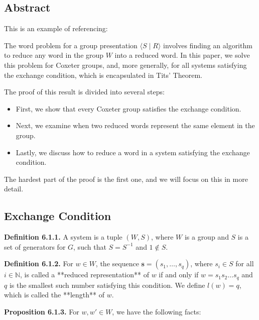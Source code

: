 \documentclass[../main.tex]{subfiles}
\begin{document}
\setcounter{subsection}{-1}
\subsection{Abstract}


This is an example of referencing: \cite{Bourbaki}\cite{Davis}

The word problem for a group presentation \( \langle S \mid R \rangle \) involves finding an algorithm to reduce any word in the group \( W \) into a reduced word. In this paper, we solve this problem for Coxeter groups, and, more generally, for all systems satisfying the exchange condition, which is encapsulated in Tits' Theorem.

The proof of this result is divided into several steps:

\begin{itemize} 
    \item First, we show that every Coxeter group satisfies the exchange condition.
    \item Next, we examine when two reduced words represent the same element in the group.
    \item Lastly, we discuss how to reduce a word in a system satisfying the exchange condition.
\end{itemize}

The hardest part of the proof is the first one, and we will focus on this in more detail.

\subsection{Exchange Condition}
\textbf{Definition 6.1.1.} A system is a tuple \( (W, S) \), where \( W \) is a group and \( S \) is a set of generators for \( G \), such that \( S = S^{-1} \) and \( 1 \notin S \). 

\vspace{\baselineskip}
\noindent \textbf{Definition 6.1.2.} For \( w \in W \), the sequence \( \mathbf{s} = (s_1, \dots, s_q) \), where \( s_i \in S \) for all \( i \in \mathbb{N} \), is called a **reduced representation** of \( w \) if and only if \( w = s_1 s_2 \dots s_q \) and \( q \) is the smallest such number satisfying this condition. We define \( l(w) = q \), which is called the **length** of \( w \).

\vspace{\baselineskip}
\noindent \textbf{Proposition 6.1.3.} For \( w, w' \in W \), we have the following facts:
\end{document}
